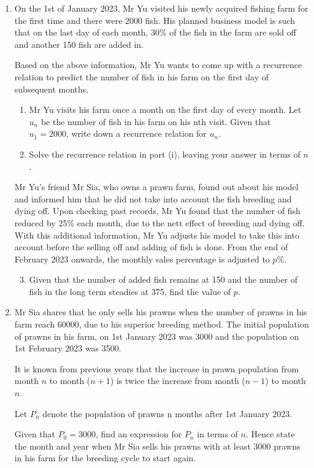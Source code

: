 \documentclass{jhwhw}
\begin{document}
    \problem{}
        \begin{enumerate}
            \item On the 1st of January 2023, Mr Yu visited his newly acquired fishing farm for the first time and there were 2000 fish. His planned business model is such that on the last day of
            each month, 30\% of the fish in the farm are sold off and another 150 fish are added in.

            Based on the above information, Mr Yu wants to come up with a recurrence relation to predict the number of fish in his farm on the first day of subsequent months.

            \begin{enumerate}
                \item Mr Yu visits his farm once a month on the first day of every month. Let $u_n$ be the number of fish in his farm on his nth visit. Given that $u_1 = 2000$, write down a recurrence relation for $u_n$.
                \item Solve the recurrence relation in part (i), leaving your answer in terms of $n$.
            \end{enumerate}

            Mr Yu's friend Mr Sia, who owns a prawn farm, found out about his model and informed him that he did not take into account the fish breeding and dying off. Upon checking past records, Mr Yu found that the number of fish reduced by 25\% each month, due to the nett effect of breeding and dying off. With this additional information, Mr Yu adjusts his model to take this into account before the selling off and adding of fish is done. From the end of February 2023 onwards, the monthly sales percentage is adjusted to $p$\%.

            \begin{enumerate}
                \setcounter{enumii}{2}
                \item Given that the number of added fish remains at 150 and the number of fish in the long term steadies at 375, find the value of $p$.
            \end{enumerate}

            \item Mr Sia shares that he only sells his prawns when the number of prawns in his farm reach $60000$, due to his superior breeding method. The initial population of prawns in his farm, on 1st January 2023 was 3000 and the population on 1st February 2023 was 3500.
            
            It is known from previous years that the increase in prawn population from month $n$ to month ($n+1$) is twice the increase from month ($n-1$) to month $n$.

            Let $P_n$ denote the population of prawns n months after 1st January 2023.

            Given that $P_0 = 3000$, find an expression for $P_n$ in terms of $n$. Hence state the month and year when Mr Sia sells his prawns with at least 3000 prawns in his farm for the breeding cycle to start again.
        \end{enumerate}
\end{document}
